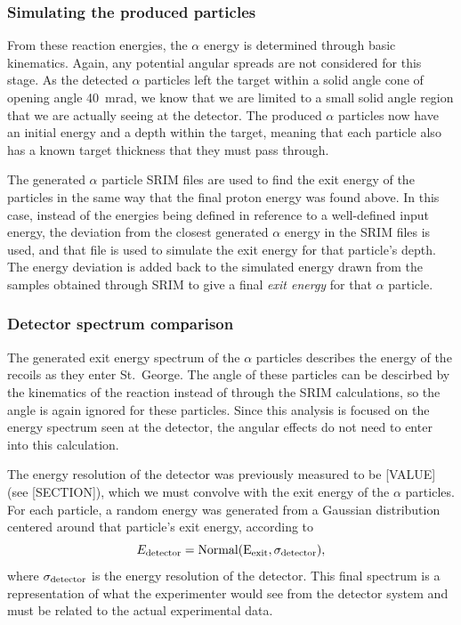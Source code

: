 \subsubsection{Simulating the produced
particles}\label{simulating-the-produced-particles}

From these reaction energies, the $\alpha$ energy is determined through
basic kinematics. Again, any potential angular spreads are not
considered for this stage. As the detected $\alpha$ particles left the
target within a solid angle cone of opening angle
40~mrad, we know that we are limited to a small solid
angle region that we are actually seeing at the detector. The produced
$\alpha$ particles now have an initial energy and a depth within the
target, meaning that each particle also has a known target thickness
that they must pass through.

The generated $\alpha$ particle SRIM files are used to find the exit
energy of the particles in the same way that the final proton energy was
found above. In this case, instead of the energies being defined in
reference to a well-defined input energy, the deviation from the closest
generated $\alpha$ energy in the SRIM files is used, and that file is
used to simulate the exit energy for that particle's depth. The energy
deviation is added back to the simulated energy drawn from the samples
obtained through SRIM to give a final \textit{exit energy} for that
$\alpha$ particle.


\subsubsection{Detector spectrum
comparison}\label{detector-spectrum-comparison}

The generated exit energy spectrum of the $\alpha$ particles describes
the energy of the recoils as they enter St.\ George. The angle of these
particles can be descirbed by the kinematics of the reaction instead of
through the SRIM calculations, so the angle is again ignored for these
particles. Since this analysis is focused on the energy spectrum seen at
the detector, the angular effects do not need to enter into this
calculation.

The energy resolution of the detector was previously measured to be
[VALUE] (see [SECTION]), which we must convolve with the exit
energy of the $\alpha$ particles. For each particle, a random energy
was generated from a Gaussian distribution centered around that
particle's exit energy, according to
\[
    E_{\rm{detector}} = \rm{Normal}(E_{\rm{exit}},\sigma_{\rm{detector}}),
\]
where $\sigma_{\rm{detector}}$ is the energy resolution
of the detector. This final spectrum is a representation of what the
experimenter would see from the detector system and must be related to
the actual experimental data.

